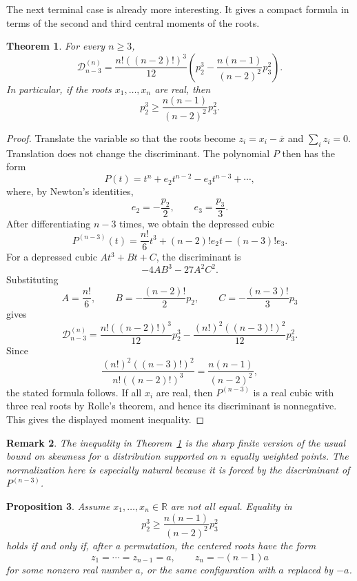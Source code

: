\documentclass[11pt]{amsart}
\numberwithin{equation}{section}
\newtheorem{theorem}{Theorem}
\newtheorem{proposition}[theorem]{Proposition}
\newtheorem{remark}[theorem]{Remark}
\newcommand{\bR}{\mathbb R}
\newcommand{\D}{\mathcal D}
\newcommand{\barx}{\overline{x}}
\begin{document}
The next terminal case is already more interesting.  It gives a compact formula
in terms of the second and third central moments of the roots.

\begin{theorem}\label{thm:cubic}
For every $n\ge3$,
\[
\boxed{
\D_{n-3}^{(n)}=\frac{n!((n-2)!)^3}{12}
\left(p_2^3-\frac{n(n-1)}{(n-2)^2}p_3^2\right).}
\]
In particular, if the roots $x_1,\ldots,x_n$ are real, then
\[
 p_2^3\ge \frac{n(n-1)}{(n-2)^2}p_3^2 .
\]
\end{theorem}

\begin{proof}
Translate the variable so that the roots become $z_i=x_i-\barx$ and
$\sum_i z_i=0$.  Translation does not change the discriminant.
The polynomial $P$ then has the form
\[
P(t)=t^n+e_2t^{n-2}-e_3t^{n-3}+\cdots,
\]
where, by Newton's identities,
\[
e_2=-\frac{p_2}{2},\qquad e_3=\frac{p_3}{3}.
\]
After differentiating $n-3$ times, we obtain the depressed cubic
\[
P^{(n-3)}(t)=\frac{n!}{6}t^3+(n-2)!e_2t-(n-3)!e_3.
\]
For a depressed cubic $At^3+Bt+C$, the discriminant is
\[
-4AB^3-27A^2C^2.
\]
Substituting
\[
A=\frac{n!}{6},\qquad
B=-\frac{(n-2)!}{2}p_2,
\qquad
C=-\frac{(n-3)!}{3}p_3
\]
gives
\[
\D_{n-3}^{(n)}
=\frac{n!((n-2)!)^3}{12}p_2^3
-\frac{(n!)^2((n-3)!)^2}{12}p_3^2.
\]
Since
\[
\frac{(n!)^2((n-3)!)^2}{n!((n-2)!)^3}
=\frac{n(n-1)}{(n-2)^2},
\]
the stated formula follows.  If all $x_i$ are real, then $P^{(n-3)}$ is a real
cubic with three real roots by Rolle's theorem, and hence its discriminant is
nonnegative.  This gives the displayed moment inequality.
\end{proof}

\begin{remark}
The inequality in Theorem~\ref{thm:cubic} is the sharp finite version of the
usual bound on skewness for a distribution supported on $n$ equally weighted
points.  The normalization here is especially natural because it is forced by
the discriminant of $P^{(n-3)}$.
\end{remark}

\begin{proposition}\label{prop:equality}
Assume $x_1,\ldots,x_n\in\bR$ are not all equal.  Equality in
\[
 p_2^3\ge \frac{n(n-1)}{(n-2)^2}p_3^2
\]
holds if and only if, after a permutation, the centered roots have the form
\[
z_1=\cdots=z_{n-1}=a,
\qquad
z_n=-(n-1)a
\]
for some nonzero real number $a$, or the same configuration with $a$ replaced
by $-a$.
\end{proposition}
\end{document}
